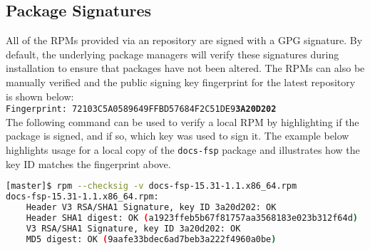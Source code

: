 \clearpage
\subsection{Package Signatures}

All of the RPMs provided via an \FSP{} repository are signed with a GPG
signature. By default, the underlying package managers will verify these signatures during
installation to ensure that packages have not been altered. The RPMs can also
be manually verified and the public signing key fingerprint for the latest
repository is shown below: \\

\texttt{Fingerprint: 72103C5A0589649FFBD57684F2C51DE9{\bf3A20D202}} \\

\noindent The following command can be used to verify a local RPM by highlighting if the package
is signed, and if so, which key was used to sign it.  The example below
highlights usage for a local copy of the \texttt{docs-fsp} package and
illustrates how the key ID matches the fingerprint above.

\begin{lstlisting}[language=bash,keywords={}]
[master]$ rpm --checksig -v docs-fsp-15.31-1.1.x86_64.rpm
docs-fsp-15.31-1.1.x86_64.rpm:
    Header V3 RSA/SHA1 Signature, key ID 3a20d202: OK
    Header SHA1 digest: OK (a1923ffeb5b67f81757aa3568183e023b312f64d)
    V3 RSA/SHA1 Signature, key ID 3a20d202: OK
    MD5 digest: OK (9aafe33bdec6ad7beb3a222f4960a0be)
\end{lstlisting}



